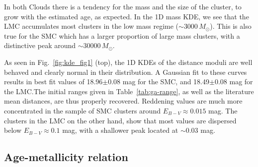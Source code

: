\documentclass[draft]{aa}
\begin{document}
In both Clouds there is a tendency for the mass and the size of the cluster, to
grow with the estimated age, as expected. In the 1D mass KDE, we see that the
LMC accumulates most clusters in the low mass regime (${\sim}3000\,M_{\odot}$).
This is also true for the SMC which has a larger proportion of large mass
clusters, with a distinctive peak around ${\sim}30000\,M_{\odot}$.


As seen in Fig.~\ref{fig:kde_fig1} (top), the 1D KDEs of the distance
moduli are well behaved and clearly normal in their distribution.
A Gaussian fit to these curves results in best fit values of 18.96$\pm$0.08 mag
for the SMC, and 18.49$\pm$0.08 mag for the LMC.\@ The initial ranges given in
Table~\ref{tab:ga-range}, as well as the literature mean distances, are thus
properly recovered.
%
Reddening values are much more concentrated in the sample of SMC clusters
around $E_{B-V}{\approx}0.015$ mag. The clusters in the LMC on the other hand,
show that most values are dispersed below $E_{B-V}{\approx}0.1$ mag, with a
shallower peak located at ${\sim}0.03$ mag.








\subsection{Age-metallicity relation}
\label{ssec:amr}
\end{document}
